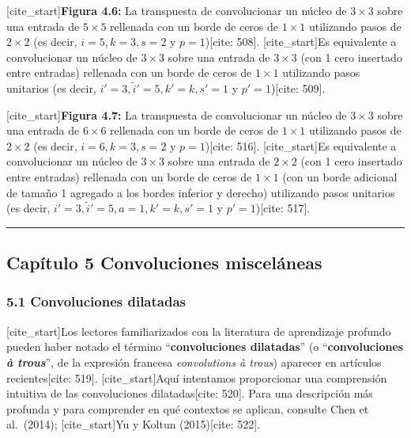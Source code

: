 \documentclass[
  super,
  preprint,
  3p]{elsarticle}
\begin{document}
{[}cite\_start{]}\textbf{Figura 4.6:} La transpuesta de convolucionar un
núcleo de \(3 \times 3\) sobre una entrada de \(5 \times 5\) rellenada
con un borde de ceros de \(1 \times 1\) utilizando pasos de
\(2 \times 2\) (es decir, \(i = 5, k = 3, s = 2\) y \(p = 1\)){[}cite:
508{]}. {[}cite\_start{]}Es equivalente a convolucionar un núcleo de
\(3 \times 3\) sobre una entrada de \(3 \times 3\) (con 1 cero insertado
entre entradas) rellenada con un borde de ceros de \(1 \times 1\)
utilizando pasos unitarios (es decir,
\(i' = 3, \tilde{i}' = 5, k' = k, s' = 1\) y \(p' = 1\)){[}cite: 509{]}.

{[}cite\_start{]}\textbf{Figura 4.7:} La transpuesta de convolucionar un
núcleo de \(3 \times 3\) sobre una entrada de \(6 \times 6\) rellenada
con un borde de ceros de \(1 \times 1\) utilizando pasos de
\(2 \times 2\) (es decir, \(i = 6, k = 3, s = 2\) y \(p = 1\)){[}cite:
516{]}. {[}cite\_start{]}Es equivalente a convolucionar un núcleo de
\(3 \times 3\) sobre una entrada de \(2 \times 2\) (con 1 cero insertado
entre entradas) rellenada con un borde de ceros de \(1 \times 1\) (con
un borde adicional de tamaño 1 agregado a los bordes inferior y derecho)
utilizando pasos unitarios (es decir,
\(i' = 3, \tilde{i}' = 5, a = 1, k' = k, s' = 1\) y \(p' = 1\)){[}cite:
517{]}.

\begin{center}\rule{0.5\linewidth}{0.5pt}\end{center}

\subsection{Capítulo 5 Convoluciones
misceláneas}\label{capuxedtulo-5-convoluciones-misceluxe1neas}

\subsubsection{5.1 Convoluciones
dilatadas}\label{convoluciones-dilatadas}

{[}cite\_start{]}Los lectores familiarizados con la literatura de
aprendizaje profundo pueden haber notado el término
``\textbf{convoluciones dilatadas}'' (o ``\textbf{convoluciones \emph{à
trous}}'', de la expresión francesa \emph{convolutions à trous})
aparecer en artículos recientes{[}cite: 519{]}. {[}cite\_start{]}Aquí
intentamos proporcionar una comprensión intuitiva de las convoluciones
dilatadas{[}cite: 520{]}. Para una descripción más profunda y para
comprender en qué contextos se aplican, consulte Chen et al.~(2014);
{[}cite\_start{]}Yu y Koltun (2015){[}cite: 522{]}.
\end{document}
